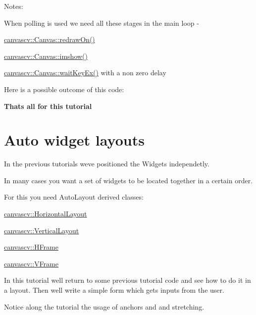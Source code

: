  Notes\+:
\begin{DoxyItemize}
\item When polling is used we need all these stages in the main loop -\/
\begin{DoxyItemize}
\item \hyperlink{classcanvascv_1_1Canvas_a018c66e277de7904b8146ea3f3feebdd}{canvascv\+::\+Canvas\+::redraw\+On()}
\item \hyperlink{classcanvascv_1_1Canvas_acaf9494a5668046dd0a8908aa97a7a43}{canvascv\+::\+Canvas\+::imshow()}
\item \hyperlink{classcanvascv_1_1Canvas_a59397db05f5d9e45264f626f6a2ae528}{canvascv\+::\+Canvas\+::wait\+Key\+Ex()} with a non zero delay
\end{DoxyItemize}
\item Here is a possible outcome of this code\+:  ~\newline

\end{DoxyItemize}

{\bfseries That\textquotesingle{}s all for this tutorial} \hypertarget{tutlayouts}{}\section{Auto widget layouts}\label{tutlayouts}
In the previous tutorials we\textquotesingle{}ve positioned the Widgets independetly.

In many cases you want a set of widgets to be located together in a certain order.

For this you need Auto\+Layout derived classes\+:
\begin{DoxyItemize}
\item \hyperlink{classcanvascv_1_1HorizontalLayout}{canvascv\+::\+Horizontal\+Layout}
\item \hyperlink{classcanvascv_1_1VerticalLayout}{canvascv\+::\+Vertical\+Layout}
\item \hyperlink{classcanvascv_1_1HFrame}{canvascv\+::\+H\+Frame}
\item \hyperlink{classcanvascv_1_1VFrame}{canvascv\+::\+V\+Frame}
\end{DoxyItemize}

In this tutorial we\textquotesingle{}ll return to some previous tutorial code and see how to do it in a layout. Then we\textquotesingle{}ll write a simple form which gets inputs from the user.

Notice along the tutorial the usage of anchors and and stretching.

